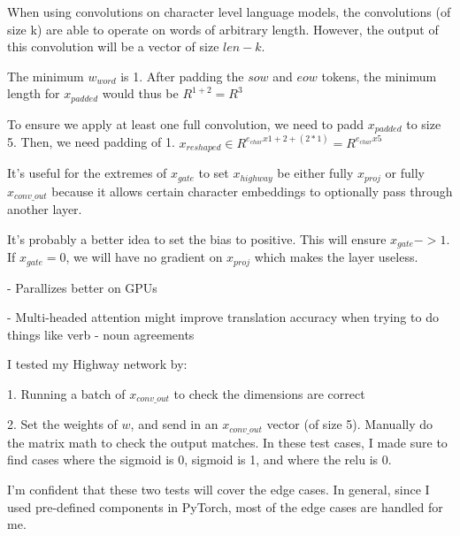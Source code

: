 \documentclass[11pt,largemargins]{homework}
\begin{document}
\maketitle

\question

When using convolutions on character level language models, the convolutions (of size k) are able to operate on words of arbitrary length. However, the output of this convolution will be a vector of size $len - k$. 

\question

The minimum $w_{word}$ is 1. After padding the $sow$ and $eow$ tokens,  the minimum length for $x_{padded}$ would thus be $R^{1+2} = R^{3}$

To ensure we apply at least one full convolution, we need to padd $x_{padded}$ to size 5. Then, we need padding of 1. $x_{reshaped} \in R^{e_{char} x 1 + 2 + (2 * 1)} =  R^{e_{char} x 5}$

\question
It's useful for the extremes of $x_{gate}$ to set $x_{highway}$ be either fully $x_{proj}$ or fully $x_{conv\_out}$ because it allows certain character embeddings to optionally pass through another layer. 

It's probably a better idea to set the bias to positive. This will ensure $x_{gate} -> 1$. If $x_{gate} = 0$, we will have no gradient on $x_{proj}$ which makes the layer useless. 

\question

- Parallizes better on GPUs

- Multi-headed attention might improve translation accuracy when trying to do things like verb - noun agreements 

\question 

I tested my Highway network by:

1. Running a batch of $x_{conv\_out}$ to check the dimensions are correct 

2. Set the weights of $w$, and send in an $x_{conv\_out}$ vector (of size 5). Manually do the matrix math to check the output matches. In these test cases, I made sure to find cases where the sigmoid is 0, sigmoid is 1, and where the relu is 0. 

I'm confident that these two tests will cover the edge cases. In general, since I used pre-defined components in PyTorch, most of the edge cases are handled for me. 
 
\end{document}

